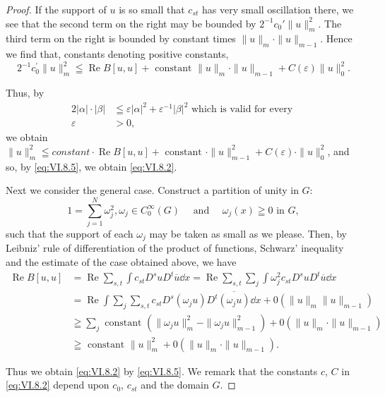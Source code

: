 \begin{proof}
If the support of $u$ is so small that $c_{st}$ has very small oscillation there, we see that the second term on the right may be bounded by $2^{-1}c_0'\|u\|_m^2$. The third term on the right is bounded by constant times $\|u\|_m\cdot \|u\|_{m-1}$. Hence we find that, constants denoting positive constants, 
\[
2 ^{-1} c _{0} ^{\prime} \| u \| _{m} ^{2} \leqq \operatorname{Re} B [ u, u ] + \text{ constant } \| u \| _{m} \cdot \| u \| _{m-1} + C (\varepsilon) \| u \| _{0} ^{2}.
\]

Thus, by 
\begin{equation}\label{eq:VI.8.6}
\begin{aligned}
2 | \alpha | \cdot | \beta |& \leqq \varepsilon | \alpha | ^{2} + \varepsilon^{-1} | \beta | ^{2} \text{ which is valid for every }
\\
\varepsilon& > 0,
\end{aligned}
\end{equation}
we obtain $\|u\|_{m}^{2}\leqq constant\cdot \operatorname{Re} B[u,u]+\text{ constant }\cdot\|u\|_{m-1}^{2}+C(\varepsilon)\cdot\|u\|_{0}^{2}$, and so, by \eqref{eq:VI.8.5}, we obtain \eqref{eq:VI.8.2}. 


Next we consider the general case. Construct a partition of unity in $G$: 
\[
1 = \sum\limits_{j=1} ^{N} \omega_{j} ^{2}, \omega_{j} \in C _{0} ^{\infty} (G) \quad \text{ and } \quad \omega_{j} (x) \geqq 0 \text{ in } G,
\]
such that the support of each $\omega_{j}$ may be taken as small as we please. Then, by Leibniz' rule of differentiation of the product of functions, Schwarz' inequality and the estimate of the case obtained above, we have 
\[
\begin{aligned}
\operatorname{Re} B [ u, u ] &= \operatorname{Re} \sum\limits_{s,t} \int c _{st} D ^{s} u D ^{t} \overline {{u}} \dd x = \operatorname{Re} \sum\limits_{s,t} \sum\limits_{j} \int \omega_{j} ^{2} c _{st} D ^{s} u D ^{t} \overline {{u}} \dd x
\\
&= \operatorname{Re} \int \sum\limits_{j} \sum\limits_{s,t} c _{st} D ^{s} (\omega_{j} u) D ^{t} \overline {{(\omega_{j} u)}} \dd x + 0 (\| u \| _{m} \| u \| _{m-1})
\\
& \geqq \sum\limits_{j} \text{ constant } (\| \omega_{j} u \| _{m} ^{2} - \| \omega_{j} u \| _{m-1} ^{2}) + 0 (\| u \| _{m} \cdot \| u \| _{m-1})
\\
& \geqq \text{ constant } \| u \| _{m} ^{2} + 0 (\| u \| _{m} \cdot \| u \| _{m-1}).
\end{aligned}
\]

Thus we obtain \eqref{eq:VI.8.2} by \eqref{eq:VI.8.5}. We remark that the constants $c$, $C$ in \eqref{eq:VI.8.2} depend upon $c_{0}$, $c_{st}$ and the domain $G$.
\end{proof}

